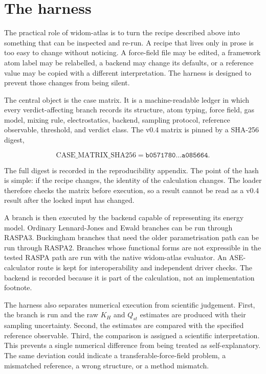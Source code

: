 \section{The harness}\label{sec:harness}

The practical role of widom-atlas is to turn the recipe described above into something that can be inspected and re-run. A recipe that lives only in prose is too easy to change without noticing. A force-field file may be edited, a framework atom label may be relabelled, a backend may change its defaults, or a reference value may be copied with a different interpretation. The harness is designed to prevent those changes from being silent.

The central object is the case matrix. It is a machine-readable ledger in which every verdict-affecting branch records its structure, atom typing, force field, gas model, mixing rule, electrostatics, backend, sampling protocol, reference observable, threshold, and verdict class. The v0.4 matrix is pinned by a SHA-256 digest,

\[
\mathrm{CASE\_MATRIX\_SHA256}
=
\texttt{b0571780\ldots a085664}.
\]

The full digest is recorded in the reproducibility appendix. The point of the hash is simple: if the recipe changes, the identity of the calculation changes. The loader therefore checks the matrix before execution, so a result cannot be read as a v0.4 result after the locked input has changed.

A branch is then executed by the backend capable of representing its energy model. Ordinary Lennard-Jones and Ewald branches can be run through RASPA3. Buckingham branches that need the older parametrisation path can be run through RASPA2. Branches whose functional forms are not expressible in the tested RASPA path are run with the native widom-atlas evaluator. An ASE-calculator route is kept for interoperability and independent driver checks. The backend is recorded because it is part of the calculation, not an implementation footnote.

The harness also separates numerical execution from scientific judgement. First, the branch is run and the raw \(K_H\) and \(Q_{st}\) estimates are produced with their sampling uncertainty. Second, the estimates are compared with the specified reference observable. Third, the comparison is assigned a scientific interpretation. This prevents a single numerical difference from being treated as self-explanatory. The same deviation could indicate a transferable-force-field problem, a mismatched reference, a wrong structure, or a method mismatch.

